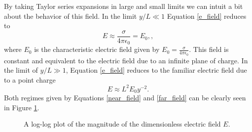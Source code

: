 \documentclass[12pt,a4paper,oneside]{book}
\begin{document}
By taking Taylor series expansions in large and small limits we can intuit a bit about the behavior of this field. In the limit $y/L \ll 1$ Equation \ref{e_field} reduces to
\begin{equation}
\label{near_field}
E \approx \frac{\sigma}{4 \pi \epsilon_0} = E_0,
,\end{equation}
where $E_0$ is the characteristic electric field given by $E_0 = \frac{\sigma}{4 \pi \epsilon_0}$. This field is constant and equivalent to the electric field due to an infinite plane of charge. In the limit of $y/L \gg 1$, Equation \ref{e_field} reduces to the familiar electric field due to a point charge
\begin{equation}
\label{far_field}
E \approx L^2 E_0 y^{-2}.
\end{equation}
Both regimes given by Equations \ref{near_field} and \ref{far_field} can be clearly seen in Figure \ref{fig:E0}.
\begin{figure}[h]
    \centering
    \def\svgwidth{\columnwidth}
    
    \caption{A log-log plot of the magnitude of the dimensionless electric field $E$.\label{fig:E0}}
\end{figure}
\newpage
\end{document}
